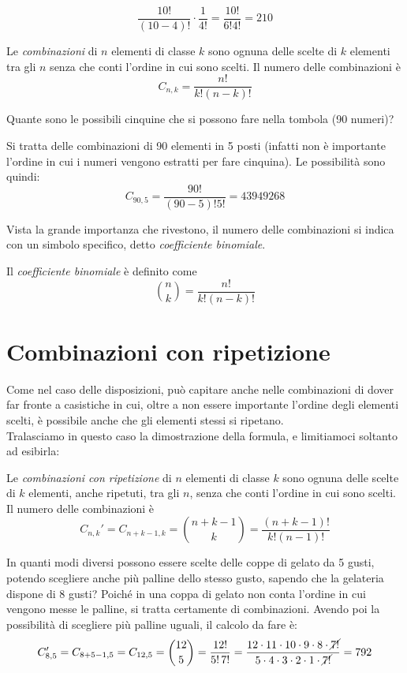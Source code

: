 \[\dfrac{10!}{(10-4)!}\cdot\dfrac{1}{4!}=\dfrac{10!}{6!4!}=210\]


\begin{definizione}
Le \emph{combinazioni} di \(n\) elementi di classe \(k\) sono ognuna delle scelte 
di \(k\) elementi tra gli \(n\) senza che conti l'ordine in cui sono scelti. Il 
numero delle combinazioni è
\[C_{n,k} =  \dfrac{n!}{k!(n-k)!}\]
\end{definizione}
\begin{esempio}
Quante sono le possibili cinquine che si possono fare nella tombola (90 numeri)?

Si tratta delle combinazioni di 90 elementi in 5 posti (infatti non è 
importante l'ordine in cui i numeri vengono estratti per fare cinquina). Le 
possibilità sono quindi:
\[C_{90,5} =  \dfrac{90!}{(90-5)!5!}=43 949 268\]
\end{esempio}

Vista la grande importanza che rivestono, il numero delle combinazioni si indica 
con un simbolo specifico, detto \emph{coefficiente binomiale}.

\begin{definizione}
Il \emph{coefficiente binomiale} è definito come 
\[ \binom{n}{k}=\dfrac{n!}{k!(n-k)!}\]
\end{definizione}

\section{Combinazioni con ripetizione}
\label{sec:04_combinazioni_con_ripetizione}

 Come nel caso delle disposizioni, può capitare anche nelle combinazioni di dover far fronte
 a casistiche in cui, oltre a non essere importante l'ordine degli elementi scelti, è possibile anche che
 gli elementi stessi si ripetano.
\\[4pt]
Tralasciamo in questo caso la dimostrazione della formula, e limitiamoci soltanto ad esibirla:

\begin{definizione}
Le \emph{combinazioni con ripetizione} di \(n\) elementi di classe \(k\) sono ognuna delle scelte 
di \(k\) elementi, anche ripetuti, tra gli \(n\), senza che conti l'ordine in cui sono scelti. Il 
numero delle combinazioni è
\[C_{n,k}' =  C_{n+k-1,k}= \binom{n+k-1}{k}=\dfrac{(n+k-1)!}{k!(n-1)!}\]
\end{definizione}

\begin{esempio}
 In quanti modi diversi possono essere scelte delle coppe di gelato da 5 gusti, potendo scegliere
 anche più palline dello stesso gusto, sapendo che la gelateria dispone di 8 gusti?
 Poiché in una coppa di gelato non conta l'ordine in
 cui vengono messe le palline, si tratta certamente di combinazioni. Avendo poi la possibilità
 di scegliere più palline uguali, il calcolo da fare è:
 \[C_{8,5}' = C_{8+5-1,5} = C_{12,5} = \binom{12}{5} = \frac{12!}{5!\, 7!} =
 \frac{12 \cdot 11 \cdot 10 \cdot 9 \cdot 8 \cdot \cancel{7!}}{5 \cdot 4 \cdot 3\cdot 2\cdot 1 \cdot \cancel{7!}}=792\]
\end{esempio}
